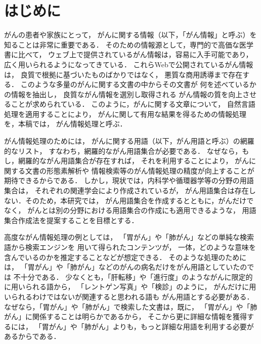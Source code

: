 \documentclass[japanese]{jnlp_1.4}
\begin{document}
\maketitle


\section{はじめに}
\label{s:はじめに}

がんの患者や家族にとって，
がんに関する情報（以下，「がん情報」と呼ぶ）を知ることは非常に重要である．
そのための情報源として，専門的で高価な医学書に比べて，
ウェブ上で提供されているがん情報は，容易に入手可能であり，
広く用いられるようになってきている\cite{c1,c2}．
これらWebで公開されているがん情報は，
良質で根拠に基づいたものばかりではなく，
悪質な商用誘導まで存在する\cite{c3,c4}．
このような多量のがんに関する文書の中からその文書が
何を述べているかの情報を抽出し，
良質ながん情報を選別し取得される
がん情報の質を向上させることが求められている．
このように，がんに関する文章について，
自然言語処理を適用することにより，
がんに関して有用な結果を得るための情報処理を，本稿では，
がん情報処理と呼ぶ．

がん情報処理のためには，
がんに関する用語（以下，がん用語と呼ぶ）の網羅的なリスト，
すなわち，網羅的ながん用語集合が必要である．
なぜなら，もし，網羅的ながん用語集合が存在すれば，
それを利用することにより，
がんに関する文書の形態素解析や
情報検索等のがん情報処理の精度が向上することが期待できるからである．
しかし，現状では，内科学や循環器学等の分野の用語集合は，
それぞれの関連学会により作成されているが，
がん用語集合は存在しない．そのため，本研究では，
がん用語集合を作成するとともに，がんだけでなく，
がんとは別の分野における用語集合の作成にも適用できるような，
用語集合作成法を提案することを目標とする．

高度ながん情報処理の例としては，
「胃がん」や「肺がん」などの単純な検索語から検索エンジンを
用いて得られたコンテンツが，
一体，どのような意味を含んでいるのかを推定することなどが想定できる．
そのような処理のためには，
「胃がん」や「肺がん」などのがんの病名だけをがん用語としていたのでは
不十分である．
少なくとも，「肝転移」や「進行度」のようながんに限定的に用いられる語から，
「レントゲン写真」や「検診」のように，
がんだけに用いられるわけではないが関連すると思われる語も
がん用語とする必要がある．
なぜなら，「胃がん」や「肺がん」で検索した文書は，既に，
「胃がん」や「肺がん」に関係することは明らかであるから，
そこから更に詳細な情報を獲得するには，
「胃がん」や「肺がん」よりも，もっと詳細な用語を利用する必要が
あるからである．
\end{document}
